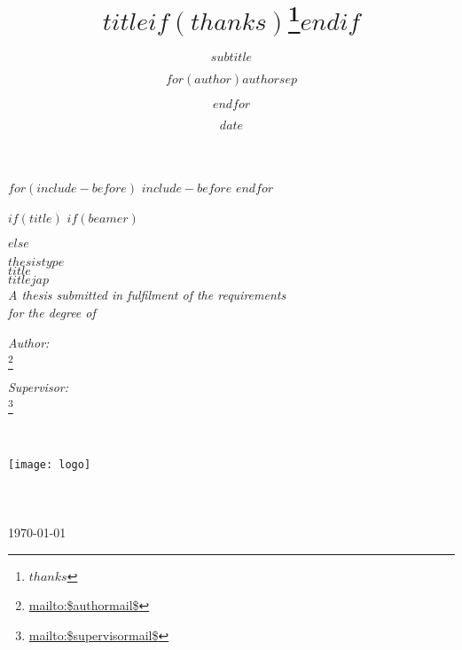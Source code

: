 \documentclass[oneside,$if(fontsize)$$fontsize$,$endif$$if(lang)$$babel-lang$,$endif$$if(papersize)$$papersize$paper,$endif$$if(beamer)$ignorenonframetext,$if(handout)$handout,$endif$$if(aspectratio)$aspectratio=$aspectratio$,$endif$$endif$$for(classoption)$$classoption$$sep$,$endfor$]{Thesis}
\title{$title$$if(thanks)$\thanks{$thanks$}$endif$}
\subtitle{$subtitle$}
\author{$for(author)$$author$$sep$ \and $endfor$}
\institute{$for(institute)$$institute$$sep$ \and $endfor$}
\date{$date$}
\title{\ttitle}
\DeclareRobustCommand{\href}[2]{#2\footnote{\url{#1}}}
\begin{document}
$for(include-before)$
  $include-before$
$endfor$


$if(title)$
  $if(beamer)$

  $else$

\frontmatter


\fancyhead{}
\rhead{\thepage}
\lhead{}

\pagestyle{fancy}

\newcommand{\HRule}{\rule{\linewidth}{0.5mm}}







\begin{titlepage}
\begin{center}

\textsc{\Large $thesistype$}\\[0.5cm]

{\LARGE \bfseries $title$}\\[0.4cm]
{\LARGE \bfseries $titlejap$}\\[0.4cm]

\large \textit{A thesis submitted in fulfilment of the requirements\\ for the degree of \degreename}\\[2cm]

\begin{minipage}{0.4\textwidth}
\begin{flushleft} \large
\emph{Author:}\\
\href{mailto:$authormail$}{\authornames}\\
\authoridnums
\end{flushleft}
\end{minipage}
\begin{minipage}{0.4\textwidth}
\begin{flushright} \large
\emph{Supervisor:} \\
\href{mailto:$supervisormail$}{\supname}\\
 \ \
\end{flushright}
\end{minipage}\\[4cm]

\texttt{[image: logo]}\\[3cm]

\facname\\\deptname\\\univname\\[1cm]

{\large \today}\\

\vfill
\end{center}

\end{titlepage}
\end{document}
